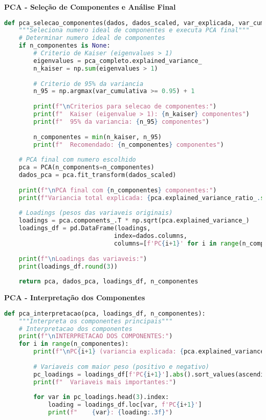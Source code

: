 \begin{researchbox}
\textbf{PCA - Seleção de Componentes e Análise Final}

\begin{lstlisting}[language=Python]
def pca_selecao_componentes(dados, dados_scaled, var_explicada, var_cumulativa, n_componentes=None):
    """Seleciona numero ideal de componentes e executa PCA final"""
    # Determinar numero ideal de componentes
    if n_componentes is None:
        # Criterio de Kaiser (eigenvalues > 1)
        eigenvalues = pca_completo.explained_variance_
        n_kaiser = np.sum(eigenvalues > 1)
        
        # Criterio de 95% da variancia
        n_95 = np.argmax(var_cumulativa >= 0.95) + 1
        
        print(f"\nCriterios para selecao de componentes:")
        print(f"  Kaiser (eigenvalue > 1): {n_kaiser} componentes")
        print(f"  95% da variancia: {n_95} componentes")
        
        n_componentes = min(n_kaiser, n_95)
        print(f"  Recomendado: {n_componentes} componentes")
    
    # PCA final com numero escolhido
    pca = PCA(n_components=n_componentes)
    dados_pca = pca.fit_transform(dados_scaled)
    
    print(f"\nPCA final com {n_componentes} componentes:")
    print(f"Variancia total explicada: {pca.explained_variance_ratio_.sum():.3f} ({pca.explained_variance_ratio_.sum()*100:.1f}%)")
    
    # Loadings (pesos das variaveis originais)
    loadings = pca.components_.T * np.sqrt(pca.explained_variance_)
    loadings_df = pd.DataFrame(loadings, 
                              index=dados.columns, 
                              columns=[f'PC{i+1}' for i in range(n_componentes)])
    
    print(f"\nLoadings das variaveis:")
    print(loadings_df.round(3))
    
    return pca, dados_pca, loadings_df, n_componentes
\end{lstlisting}
\end{researchbox}

\begin{researchbox}
\textbf{PCA - Interpretação dos Componentes}

\begin{lstlisting}[language=Python]
def pca_interpretacao(pca, loadings_df, n_componentes):
    """Interpreta os componentes principais"""
    # Interpretacao dos componentes
    print(f"\nINTERPRETACAO DOS COMPONENTES:")
    for i in range(n_componentes):
        print(f"\nPC{i+1} (variancia explicada: {pca.explained_variance_ratio_[i]:.3f}):")
        
        # Variaveis com maior peso (positivo e negativo)
        pc_loadings = loadings_df[f'PC{i+1}'].abs().sort_values(ascending=False)
        print(f"  Variaveis mais importantes:")
        
        for var in pc_loadings.head(3).index:
            loading = loadings_df.loc[var, f'PC{i+1}']
            print(f"    {var}: {loading:.3f}")
\end{lstlisting}
\end{researchbox}


